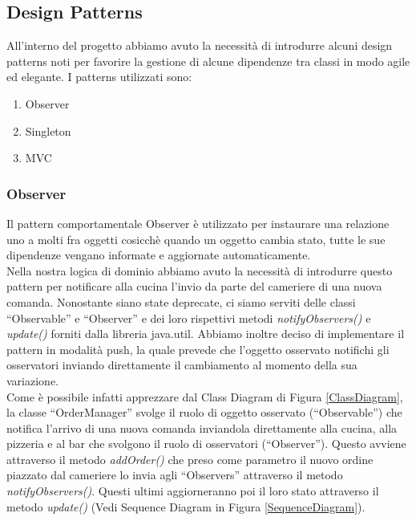 \documentclass{article}
\begin{document}
\subsection{Design Patterns}

All'interno del progetto abbiamo avuto la necessit\`a di introdurre alcuni design patterns noti per favorire la gestione di alcune dipendenze tra classi in modo agile ed elegante. I patterns utilizzati sono:

\begin{enumerate}
\item Observer
\item Singleton
\item MVC
\end{enumerate}

\subsubsection{Observer}
\label{Observer}
Il pattern comportamentale Observer \`e utilizzato per instaurare una relazione uno a molti fra oggetti cosicch\`e quando un oggetto cambia stato, tutte le sue dipendenze vengano informate e aggiornate automaticamente.\\
Nella nostra logica di dominio abbiamo avuto la necessit\`a di introdurre questo pattern per notificare alla cucina l'invio da parte del cameriere di una nuova comanda. Nonostante siano state deprecate, ci siamo serviti delle classi ``Observable'' e ``Observer'' e dei loro rispettivi metodi \textit{notifyObservers()} e \textit{update()} forniti dalla libreria java.util. Abbiamo inoltre deciso di implementare il pattern in modalit\`a push, la quale prevede che l'oggetto osservato notifichi gli osservatori inviando direttamente il cambiamento al momento della sua variazione. \\ Come \`e possibile infatti apprezzare dal Class Diagram di Figura \ref{ClassDiagram}, la classe ``OrderManager'' svolge il ruolo di oggetto osservato (``Observable'') che notifica l'arrivo di una nuova comanda inviandola direttamente alla cucina, alla pizzeria e al bar che svolgono il ruolo di osservatori (``Observer''). Questo avviene attraverso il metodo \textit{addOrder()} che preso come parametro il nuovo ordine piazzato dal cameriere lo invia agli ``Observers'' attraverso il metodo \textit{notifyObservers()}. Questi ultimi aggiorneranno poi il loro stato attraverso il metodo \textit{update()} (Vedi Sequence Diagram in Figura \ref{SequenceDiagram}).
\end{document}
